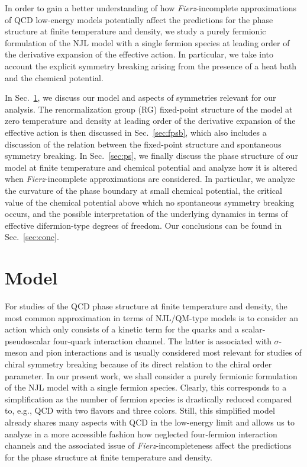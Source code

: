 \documentclass[prd,english,preprintnumbers,amsmath,amssymb,nofootinbib,twocolumn,superscriptaddress]{revtex4-1}
\begin{document}
{In order to gain a better understanding of how {\it Fierz}-incomplete approximations of QCD low-energy models potentially affect the 
predictions for the phase structure at finite temperature and density, we study a purely fermionic formulation of the NJL model with 
{a single} fermion species
at leading order of the derivative expansion of the effective action. In particular, we take into account
the explicit symmetry breaking arising from the presence of a heat bath and the chemical potential. 

In Sec.~\ref{sec:model}, we discuss our model and aspects of symmetries relevant for our analysis. The renormalization group (RG) fixed-point structure of
the model at zero temperature and density at leading order of the derivative expansion of the effective action is then
discussed in Sec.~\ref{sec:fpsb}, which also includes a discussion of the {relation between the fixed-point structure and spontaneous}
symmetry breaking. In Sec.~\ref{sec:ps}, we finally discuss the phase structure of our model at finite temperature and 
chemical potential and analyze how it is altered when {\it Fierz}-incomplete approximations are considered. In particular, we 
analyze the curvature of the phase boundary at small chemical potential, the critical value of the chemical potential above which no spontaneous
symmetry breaking occurs, and the possible interpretation of the underlying dynamics in terms of 
effective difermion-type degrees of freedom. Our conclusions can be found in Sec.~\ref{sec:conc}.

%
\section{Model}\label{sec:model}
%
For studies of the QCD phase structure at finite temperature and density, the most common approximation in terms of NJL/QM-type models
is to consider an action which only consists of a kinetic term for the quarks and a scalar-pseudoscalar four-quark 
interaction channel. The latter is associated with $\sigma$-meson and pion interactions and is usually considered most relevant
for studies of chiral symmetry breaking because of its direct relation to the chiral order parameter. 
In our present work, we shall consider 
a purely fermionic formulation of the NJL model {with a single} fermion species. Clearly, this corresponds to 
a simplification as the number of fermion species is drastically reduced compared to, e.g., QCD with two flavors and three colors.
Still, this simplified model already shares many aspects with QCD in the low-energy limit and
 allows us to analyze {in a more accessible fashion how} neglected four-fermion interaction
channels and the associated issue of {\it Fierz}-incompleteness affect the predictions for the phase structure at finite temperature and density.

}
\end{document}
